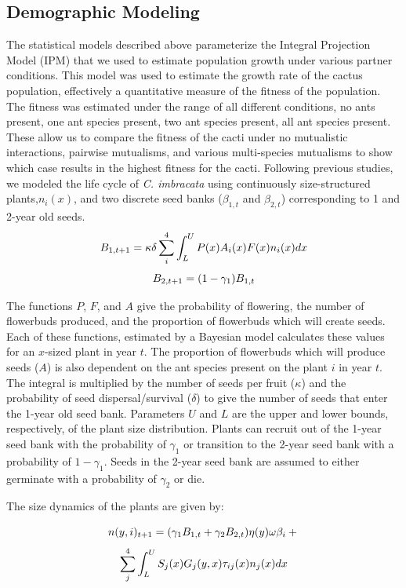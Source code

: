 \documentclass[12pt,a4paper]{article}
\begin{document}
	\subsection*{Demographic Modeling}

The statistical models described above parameterize the Integral Projection Model (IPM) that we used to estimate population growth under various partner conditions.  This model was used to estimate the growth rate of the cactus population, effectively a quantitative measure of the fitness of the population. The fitness was estimated under the range of all different conditions, no ants present, one ant species present, two ant species present, all ant species present. These allow us to compare the fitness of the cacti under no mutualistic interactions, pairwise mutualisms, and various multi-species mutualisms to show which case results in the highest fitness for the cacti. Following previous studies, we modeled the life cycle of \textit{C. imbracata} using continuously size-structured plants,$n_i(x)$, and two discrete seed banks ($\beta_{1,t}$ and $\beta_{2,t}$) corresponding to 1 and 2-year old seeds.
$$
B_{1, t+1} = \kappa \delta \sum_{i}^{4} \int_L^U P(x) A_i(x) F(x)n_i(x) dx \\
$$
$$
B_{2,t+1} =  (1 - \gamma_1)B_{1,t}\\
$$

The functions $P$, $F$, and $A$ give the probability of flowering, the number of flowerbuds produced, and the proportion of flowerbuds which will create seeds. Each of these functions, estimated by a Bayesian model calculates these values for an $x$-sized plant in year $t$. The proportion of flowerbuds which will produce seeds ($A$) is also dependent on the ant species present on the plant $i$ in year $t$. The integral is multiplied by the number of seeds per fruit ($\kappa$) and the probability of seed dispersal/survival ($\delta$) to give the number of seeds that enter the 1-year old seed bank. Parameters $U$ and $L$ are the upper and lower  bounds, respectively, of the plant size distribution. Plants can recruit out of the 1-year seed bank with the probability of $\gamma_1$ or transition to the 2-year seed bank with a probability of $1 - \gamma_1$. Seeds in the 2-year seed bank are assumed to either germinate with a probability of $\gamma_2$ or die. 

The size dynamics of the plants are given by:

$$
n(y,i)_{t+1} = (\gamma_1 B_{1,t} + \gamma_2 B_{2,t}) \eta(y) \omega \beta_i  + \\
$$
$$
\sum_{j}^{4} \int_L^U S_j(x) G_j(y,x) \tau_{ij}(x) n_j(x) dx \\
$$
\end{document}
